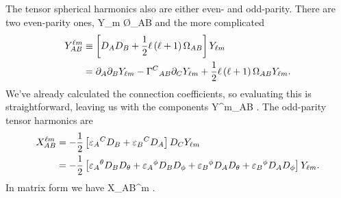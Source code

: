 \documentclass{article}
\begin{document}
The tensor spherical harmonics also are either even- and odd-parity.  
There are two even-parity ones,
\be
Y_{\ell m} \O_{AB} \doteq
{}
\ee
and the more complicated
\begin{align}
Y^{\ell m}_{AB} & \equiv \left[ D_A D_B + \frac{1}{2} \ell \left( \ell + 1 \right) \Omega_{AB} \right] Y_{\ell m} \\
& =  \partial_A \partial_B Y_{\ell m}  -  {\Gamma^C}_{AB} \partial_C Y_{\ell m} + \frac{1}{2} \ell \left( \ell + 1 \right) \Omega_{AB} Y_{\ell m}.
\end{align}
We've already calculated the connection coefficients, so evaluating this is straightforward, leaving us with the components
\be
Y^{\ell m}_{AB} \doteq
{}.
\ee
The odd-parity tensor harmonics are
\begin{align}
X_{AB}^{\ell m} & = - \frac{1}{2} \left[ {\varepsilon_A}^C D_B + {\varepsilon_B}^C D_A \right] D_C Y_{\ell m} \\
& = - \frac{1}{2} \left[ {\varepsilon_A}^\theta D_B D_\theta + {\varepsilon_A}^\phi D_B D_\phi + {\varepsilon_B}^\phi D_A D_\theta + {\varepsilon_B}^\phi D_A D_\phi \right]  Y_{\ell m}.
\end{align}
In matrix form we have
\be
X_{AB}^{\ell m}
\doteq
{}.
\ee
\end{document}
